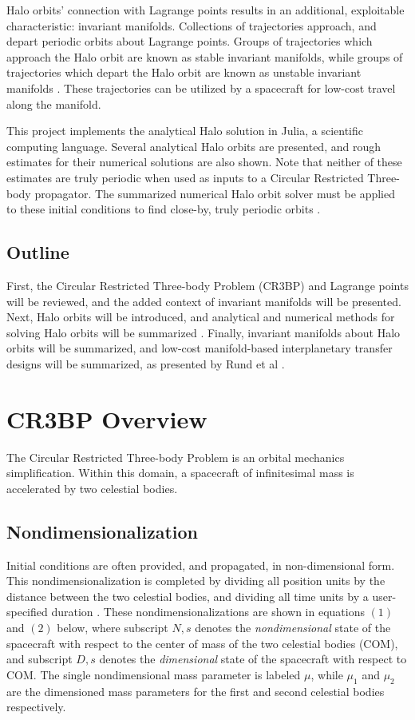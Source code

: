 \documentclass[conf]{new-aiaa}
\begin{document}
\begin{multicols}{2}
Halo orbits' connection with Lagrange points results in an additional, 
exploitable characteristic: invariant manifolds. Collections of 
trajectories approach, and depart periodic orbits about Lagrange points.
Groups of trajectories which approach the Halo orbit are known 
as stable invariant manifolds, while groups of trajectories which 
depart the Halo orbit are known as unstable invariant manifolds
\cite{rund2018interplanetary}. These trajectories can be utilized by a
spacecraft for low-cost travel along the manifold. 

This project implements the analytical Halo solution in Julia, a scientific
computing language. Several analytical Halo orbits are presented, and 
rough estimates for their numerical solutions are also shown. Note that
neither of these estimates are truly periodic when used as inputs to 
a Circular Restricted Three-body propagator. The summarized numerical
Halo orbit solver must be applied to these initial conditions to find
close-by, truly periodic orbits \cite{rund2018interplanetary} 
\cite{howell1984three}.

\subsection{Outline}
First, the Circular Restricted Three-body Problem (CR3BP) and
Lagrange points will be reviewed, and the added context of 
invariant manifolds will be presented. Next, Halo orbits will be 
introduced, and analytical and numerical methods for solving
Halo orbits will be summarized \cite{rund2018interplanetary}
\cite{howell1984three}. Finally, invariant manifolds about
Halo orbits will be summarized, and low-cost manifold-based 
interplanetary transfer designs will be summarized, as presented
by Rund et al \cite{rund2018interplanetary}.

\section{CR3BP Overview}
The Circular Restricted Three-body Problem is an orbital mechanics 
simplification. Within this domain, a spacecraft of infinitesimal
mass is accelerated by two celestial bodies. 

\subsection{Nondimensionalization}
Initial conditions are
often provided, and propagated, in non-dimensional form. This 
nondimensionalization is completed by dividing all position
units by the distance between the two celestial bodies, and dividing 
all time units by a user-specified duration \cite{vallado2001fundamentals}.
These nondimensionalizations are shown in equations $(1)$ and $(2)$ below,
where subscript $N,s$ denotes the \textit{nondimensional} state of the spacecraft with 
respect to the center of mass of the two celestial bodies (COM), and subscript
$D,s$ denotes the \textit{dimensional} state of the spacecraft with respect to COM. 
The single nondimensional mass parameter is labeled $\mu$, while $\mu_1$ and $\mu_2$ are the
dimensioned mass parameters for the first and second celestial bodies respectively.


\end{multicols}
\end{document}
